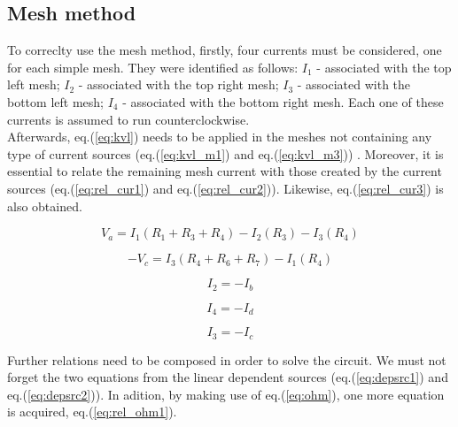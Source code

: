 
\subsection{Mesh method}
\label{subsec:mesh_met}

To correclty use the mesh method, firstly, four currents must be considered, one for each simple mesh.
They were identified as follows: $I_1$ - associated with the top left mesh; $I_2$ - associated with
the top right mesh; $I_3$ - associated with the bottom left mesh; $I_4$ - associated with the bottom
right mesh. Each one of these currents is assumed to run counterclockwise. \\

Afterwards, eq.(\ref{eq:kvl}) needs to be applied in the meshes not containing any type of current
sources (eq.(\ref{eq:kvl_m1}) and eq.(\ref{eq:kvl_m3})) . Moreover, it is essential to relate the
remaining mesh current with those created by the current sources (eq.(\ref{eq:rel_cur1}) and
eq.(\ref{eq:rel_cur2})). Likewise, eq.(\ref{eq:rel_cur3}) is also obtained.

\begin{equation}
	V_a = I_1(R_1+R_3+R_4)-I_2(R_3)-I_3(R_4)
	\label{eq:kvl_m1}
\end{equation}

\begin{equation}
	-V_c = I_3(R_4+R_6+R_7)-I_1(R_4)
	\label{eq:kvl_m3}
\end{equation}

\begin{equation}
	I_2 = -I_b
	\label{eq:rel_cur1}
\end{equation}

\begin{equation}
	I_4 = -I_d
	\label{eq:rel_cur2}
\end{equation}

\begin{equation}
	I_3 = -I_c
	\label{eq:rel_cur3}
\end{equation}

Further relations need to be composed in order to solve the circuit. We must not forget the two equations
from the linear dependent sources (eq.(\ref{eq:depsrc1}) and eq.(\ref{eq:depsrc2})). In adition, by
making use of eq.(\ref{eq:ohm}), one more equation is acquired, eq.(\ref{eq:rel_ohm1}).

